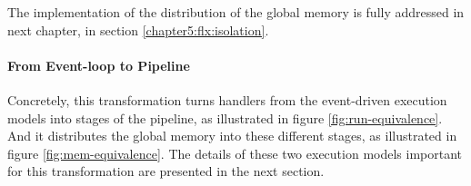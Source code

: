 The implementation of the distribution of the global memory is fully addressed in next chapter, in section \ref{chapter5:flx:isolation}.
















\paragraph{From Event-loop to Pipeline}

Concretely, this transformation turns handlers from the event-driven execution models into stages of the pipeline, as illustrated in figure \ref{fig:run-equivalence}.
And it distributes the global memory  into these different stages, as illustrated in figure \ref{fig:mem-equivalence}.
The details of these two execution models important for this transformation are presented in the next section.

